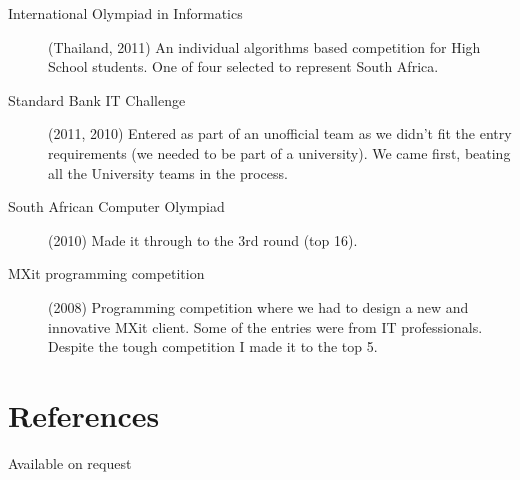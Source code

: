 \documentclass[margin,line,a4paper]{resume}
\begin{document}
\begin{resume}
\begin{description}
                \item [International Olympiad in Informatics] (Thailand, 2011) An individual 
                algorithms based competition for High School students. One of four selected
                to represent South Africa.

                \item [Standard Bank IT Challenge] (2011, 2010) Entered as part of an unofficial team
                as we didn't fit the entry requirements (we needed to be part of a university).
                We came first, beating all the University teams in the process.

                \item [South African Computer Olympiad] (2010) Made it through to the 3rd
                round (top 16).

                \item [MXit programming competition] (2008) Programming competition where we
                had to design a new and innovative MXit client.  Some of the
                entries were from IT professionals. Despite the tough competition I made it to the top 5.
            \end{description}

        \section{\mysidestyle References}
            Available on request
    \end{resume}
\end{document}
